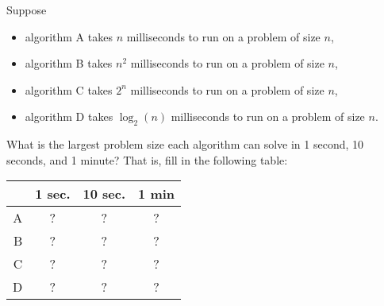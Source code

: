 \begin{prob}
    Suppose 
    \begin{itemize}
        \item algorithm A takes $n$ milliseconds to run on a problem of size $n$,
        \item algorithm B takes $n^2$ milliseconds to run on a problem of size $n$, 
        \item algorithm C takes $2^n$ milliseconds to run on a problem of size $n$,
        \item algorithm D takes $\log_2(n)$ milliseconds to run on a problem of size $n$.
    \end{itemize}
    What is the largest problem size each algorithm can solve in 1 second,
    10 seconds, and 1 minute? That is, fill in the following table:

    \begin{center}
    \begin{tabular}{rccc}
        \toprule
        & 1 sec. & 10 sec. & 1 min\\ \midrule
        A & ? & ? & ?\\
        B & ? & ? & ?\\
        C & ? & ? & ?\\
        D & ? & ? & ?\\\bottomrule
    \end{tabular}
    \end{center}


    \begin{soln}
    
    \end{soln}

\end{prob}

